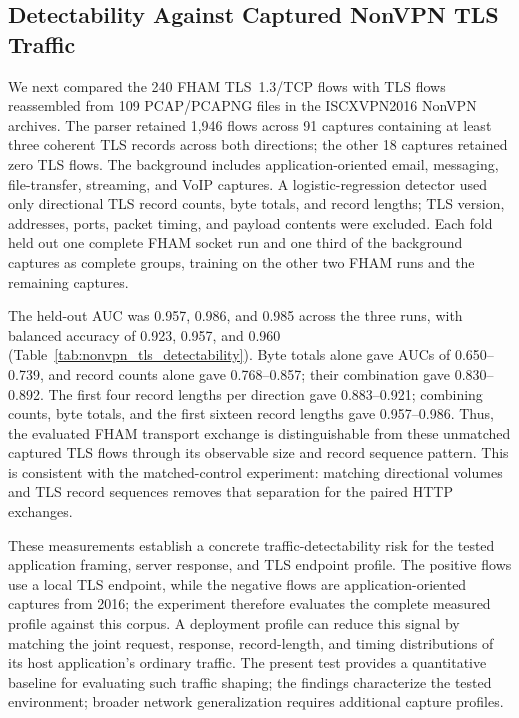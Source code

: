\documentclass[preprint,12pt]{elsarticle}
\theoremstyle{plain}
\begin{document}
\subsection{Detectability Against Captured NonVPN TLS Traffic}

We next compared the 240 FHAM TLS~1.3/TCP flows with TLS flows reassembled from
109 PCAP/PCAPNG files in the ISCXVPN2016 NonVPN archives. The parser retained
1,946 flows across 91 captures containing at least three coherent TLS records
across both directions; the other 18 captures retained zero TLS flows.
The background includes application-oriented email, messaging, file-transfer,
streaming, and VoIP captures. A logistic-regression detector used only
directional TLS record counts, byte totals, and record lengths; TLS version,
addresses, ports, packet timing, and payload contents were excluded. Each fold
held out one complete FHAM socket run and one third of the background captures as
complete groups, training on the other two FHAM runs and the remaining
captures.

The held-out AUC was 0.957, 0.986, and 0.985 across the three runs, with
balanced accuracy of 0.923, 0.957, and 0.960 (Table~\ref{tab:nonvpn_tls_detectability}).
Byte totals alone gave AUCs of 0.650--0.739, and record counts alone gave
0.768--0.857; their combination gave 0.830--0.892. The first four record
lengths per direction gave 0.883--0.921; combining counts, byte totals, and
the first sixteen record lengths gave 0.957--0.986. Thus, the evaluated FHAM transport exchange is distinguishable
from these unmatched captured TLS flows through its observable size and record
sequence pattern. This is consistent with the matched-control experiment:
matching directional volumes and TLS record sequences removes that separation
for the paired HTTP exchanges.

These measurements establish a concrete traffic-detectability risk for the
tested application framing, server response, and TLS endpoint profile. The
positive flows use a local TLS endpoint, while the negative flows are
application-oriented captures from 2016; the experiment therefore evaluates
the complete measured profile against this corpus. A deployment profile can
reduce this signal by matching the joint request, response, record-length, and
timing distributions of its host application's ordinary traffic. The present
test provides a quantitative baseline for evaluating such traffic shaping;
the findings characterize the tested environment; broader network generalization requires additional capture profiles.
\end{document}
